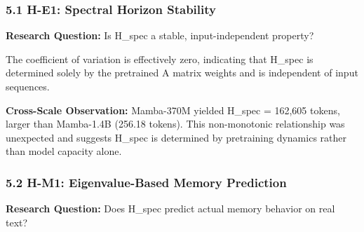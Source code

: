 
\subsubsection{5.1 H-E1: Spectral Horizon Stability}

\textbf{Research Question:} Is H\_spec a stable, input-independent property?

\begin{table}[htbp]
\centering
{}
\end{table}

The coefficient of variation is effectively zero, indicating that H\_spec is determined solely by the pretrained A matrix weights and is independent of input sequences.

\textbf{Cross-Scale Observation:} Mamba-370M yielded H\_spec = 162,605 tokens, larger than Mamba-1.4B (256.18 tokens). This non-monotonic relationship was unexpected and suggests H\_spec is determined by pretraining dynamics rather than model capacity alone.

\subsubsection{5.2 H-M1: Eigenvalue-Based Memory Prediction}

\textbf{Research Question:} Does H\_spec predict actual memory behavior on real text?

\begin{table}[htbp]
\centering
{}
\end{table}

